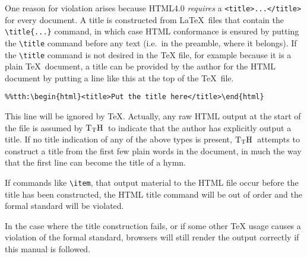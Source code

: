 \documentclass[12pt]{article}
\def\TtH{$\rm{}T_TH$}
\begin{document}
One reason for violation
arises because HTML4.0 {\it requires} a
\verb+<title>...</title>+ for every document.
A title is constructed from \LaTeX\ files that contain the \verb+\title{...}+
command, in which case HTML conformance is ensured by putting the
\verb+\title+ command before any text (i.e.~in the preamble, where it
belongs).  If the \verb+\title+ command is not desired in the \TeX
file, for example because it is a plain \TeX\ document,
a title can be provided by the author for the HTML document by putting
a line like this at the top of the \TeX\ file.
\begin{verbatim}
%%tth:\begin{html}<title>Put the title here</title>\end{html}
\end{verbatim}
This line will be ignored by \TeX. Actually, any raw HTML output at the
start of the file is assumed by \TtH\ to indicate that the author has
explicitly output a title. If no title indication of any of the above
types is present, \TtH\ attempts to construct a title from the first few
plain words in the document, in much the way that the first line can
become the title of a hymn.  

If commands like
\verb|\item|, that output material to the HTML file occur
before the title has been constructed, the HTML title command will be
out of order and the formal standard will be violated. 

In the case where the title construction fails, or if some other \TeX
usage causes a violation of the formal standard, browsers will
still render the output correctly if this manual is followed.
\end{document}
